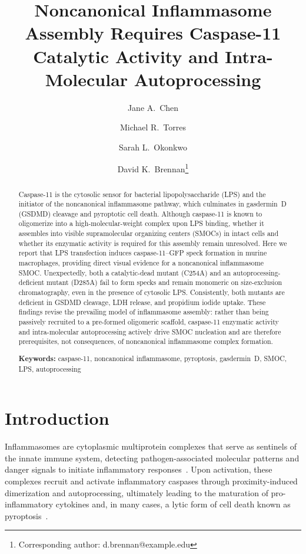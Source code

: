 \documentclass[11pt,a4paper]{article}
\title{Noncanonical Inflammasome Assembly Requires Caspase-11 Catalytic Activity and Intra-Molecular Autoprocessing}
\author[1]{Jane A.\ Chen}
\author[1]{Michael R.\ Torres}
\author[2]{Sarah L.\ Okonkwo}
\author[1,2]{David K.\ Brennan\thanks{Corresponding author: d.brennan@example.edu}}
\affil[1]{Department of Immunology, Institute of Molecular Medicine, University of Cambridge, Cambridge, UK}
\affil[2]{Centre for Innate Immunity and Inflammation, University of Melbourne, Melbourne, Australia}
\date{}
\begin{document}
\maketitle

\begin{abstract}
Caspase-11 is the cytosolic sensor for bacterial lipopolysaccharide (LPS) and the initiator of the noncanonical inflammasome pathway, which culminates in gasdermin~D (GSDMD) cleavage and pyroptotic cell death. Although caspase-11 is known to oligomerize into a high-molecular-weight complex upon LPS binding, whether it assembles into visible supramolecular organizing centers (SMOCs) in intact cells and whether its enzymatic activity is required for this assembly remain unresolved. Here we report that LPS transfection induces caspase-11--GFP speck formation in murine macrophages, providing direct visual evidence for a noncanonical inflammasome SMOC. Unexpectedly, both a catalytic-dead mutant (C254A) and an autoprocessing-deficient mutant (D285A) fail to form specks and remain monomeric on size-exclusion chromatography, even in the presence of cytosolic LPS. Consistently, both mutants are deficient in GSDMD cleavage, LDH release, and propidium iodide uptake. These findings revise the prevailing model of inflammasome assembly: rather than being passively recruited to a pre-formed oligomeric scaffold, caspase-11 enzymatic activity and intra-molecular autoprocessing actively drive SMOC nucleation and are therefore prerequisites, not consequences, of noncanonical inflammasome complex formation.

\vspace{0.5em}
\noindent\textbf{Keywords:} caspase-11, noncanonical inflammasome, pyroptosis, gasdermin~D, SMOC, LPS, autoprocessing
\end{abstract}

\section{Introduction}
\label{sec:introduction}

Inflammasomes are cytoplasmic multiprotein complexes that serve as sentinels of the innate immune system, detecting pathogen-associated molecular patterns and danger signals to initiate inflammatory responses~\citep{martinon2002, schroder2010}. Upon activation, these complexes recruit and activate inflammatory caspases through proximity-induced dimerization and autoprocessing, ultimately leading to the maturation of pro-inflammatory cytokines and, in many cases, a lytic form of cell death known as pyroptosis~\citep{broz2016, latz2013}.
\end{document}
